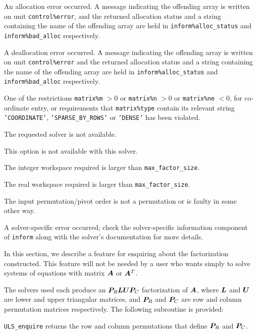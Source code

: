 \documentclass{galahad}
\newcommand{\packagename}{ULS}
\begin{document}
\begin{description}

\itt{\galerrallocate} An allocation error occurred. A message indicating
the offending
array is written on unit {\tt control\%error}, and the returned allocation
status and a string containing the name of the offending array
are held in {\tt inform\%alloc\_\-status}
and {\tt inform\%bad\_alloc} respectively.

\itt{\galerrdeallocate} A deallocation error occurred.
A message indicating the offending
array is written on unit {\tt control\%error} and the returned allocation
status and a string containing the name of the offending array
are held in {\tt inform\%alloc\_\-status}
and {\tt inform\%bad\_alloc} respectively.

\itt{\galerrrestrictions} One of the restrictions
 {\tt matrix\%m} $> 0$ or
 {\tt matrix\%n} $> 0$ or
 {\tt matrix\%ne} $< 0$, for co-ordinate entry,
  or requirements that {\tt matrix\%type}
  contain its relevant string
{\tt 'COORDINATE'}, {\tt 'SPARSE\_BY\_ROWS'} or   {\tt 'DENSE'}
  has been violated.

\itt{\galunknownsolver} The requested solver is not available.

\itt{\galerrunavailable} This option is not available with this solver.

 The integer workspace required is larger than
 {\tt max\_factor\_size}.

 The real workspace  required is larger than
 {\tt max\_factor\_size}.


  The input permutation/pivot order is not a permutation or is
    faulty in some other way.

 A solver-specific error occurred; check the solver-specific
  information component of {\tt inform} along with the solver's documentation
  for more details.

\end{description}


\galfeatures
\noindent In this section, we describe a feature for enquiring about
the factorization constructed. This feature
will not be needed by a user who wants simply to solve systems of
equations with matrix ${\bm{A}}$ or ${\bm{A}}^T$.

The solvers used each produce an ${\bm{P}}_R {\bm{L}} {\bm{U}} {\bm{P}}_C$ factorization
of ${\bm{A}}$, where ${\bm{L}}$ and ${\bm{U}}$ are lower and upper triangular
matrices, and ${\bm{P}}_R$ and ${\bm{P}}_C$ are row and column permutation
matrices respectively.
The following subroutine is provided:
\begin{description}
\ittf{} {\tt \packagename\_enquire} returns the row and column permutations
that define ${\bm{P}}_R$ and ${\bm{P}}_C$.


\end{description}
\end{document}
